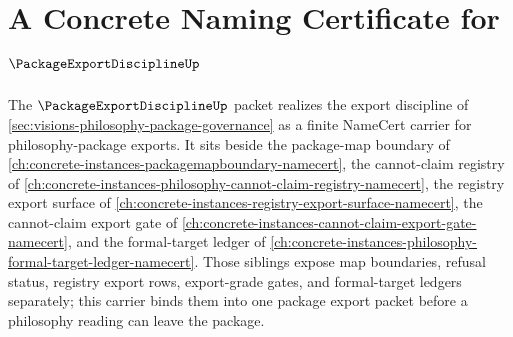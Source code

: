 \chapter{A Concrete Naming Certificate for $\PackageExportDisciplineUp$}
\label{ch:concrete-instances-package-export-discipline-namecert}

The $\PackageExportDisciplineUp$ packet realizes the export discipline of \autoref{sec:visions-philosophy-package-governance} as a finite NameCert carrier for philosophy-package exports. It sits beside the package-map boundary of \autoref{ch:concrete-instances-packagemapboundary-namecert}, the cannot-claim registry of \autoref{ch:concrete-instances-philosophy-cannot-claim-registry-namecert}, the registry export surface of \autoref{ch:concrete-instances-registry-export-surface-namecert}, the cannot-claim export gate of \autoref{ch:concrete-instances-cannot-claim-export-gate-namecert}, and the formal-target ledger of \autoref{ch:concrete-instances-philosophy-formal-target-ledger-namecert}. Those siblings expose map boundaries, refusal status, registry export rows, export-grade gates, and formal-target ledgers separately; this carrier binds them into one package export packet before a philosophy reading can leave the package.

